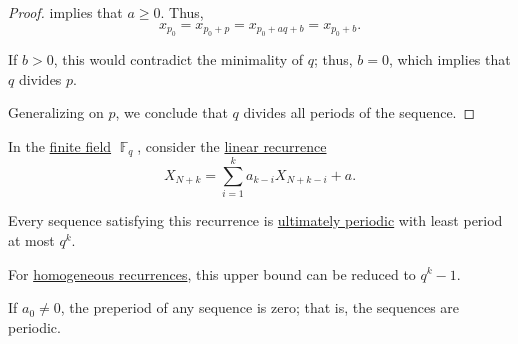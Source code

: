 \begin{proof}
   implies that \( a \geq 0 \). Thus,
  \begin{equation*}
    x_{p_0}
    =
    x_{p_0 + p}
    =
    x_{p_0 + aq + b}
    =
    x_{p_0 + b}.
  \end{equation*}

  If \( b > 0 \), this would contradict the minimality of \( q \); thus, \( b = 0 \), which implies that \( q \) divides \( p \).

  Generalizing on \( p \), we conclude that \( q \) divides all periods of the sequence.
\end{proof}

\begin{proposition}\label{thm:linear_recurrence_finite_field_periodic}
  In the \hyperref[def:finite_field]{finite field} \( \BbbF_q \), consider the \hyperref[def:linear_recurrence]{linear recurrence}
  \begin{equation*}
    X_{N+k} = \sum_{i=1}^k a_{k-i} X_{N+k-i} + a.
  \end{equation*}

  \begin{thmenum}
     Every sequence satisfying this recurrence is \hyperref[def:ultimately_periodic_sequence]{ultimately periodic} with least period at most \( q^k \).

     For \hyperref[def:homogeneous_linear_recurrence]{homogeneous recurrences}, this upper bound can be reduced to \( q^k - 1 \).

     If \( a_0 \neq 0 \), the preperiod of any sequence is zero; that is, the sequences are periodic.
  \end{thmenum}
\end{proposition}
